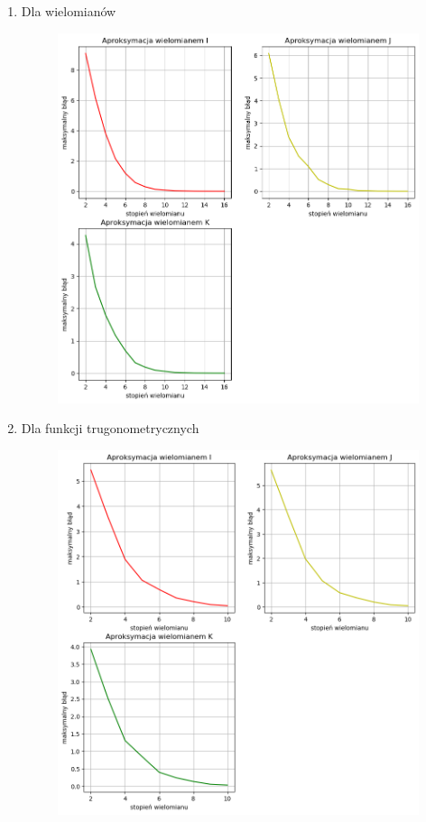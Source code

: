 \documentclass[11pt,wide]{mwart}
\begin{document}
\begin{enumerate}[•]
\item Dla wielomianów
\begin{figure}[H]
	\begin{center}
	\includegraphics[scale=0.8]{testy_wielomiany}
	\end{center}
\end{figure}
\newpage
\item Dla funkcji trugonometrycznych 
\begin{figure}[H]
	\begin{center}
	\includegraphics[scale=0.8]{testy_tryg}

\end{center}
\end{figure}
\end{enumerate}
\end{document}
